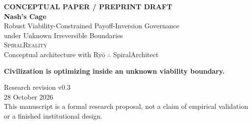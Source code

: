 \documentclass[11pt,a4paper]{article}
\numberwithin{equation}{section}
\theoremstyle{definition}
\theoremstyle{plain}
\theoremstyle{remark}
\begin{document}
\hypersetup{pageanchor=false}
\begin{titlepage}
\thispagestyle{empty}
\centering
\vspace*{1.6cm}
{\small\bfseries\color{Moss}\MakeUppercase{Conceptual Paper / Preprint Draft}}\\[1.1cm]
{\fontsize{31}{36}\selectfont\bfseries\color{Forest} Nash's Cage}\\[0.55cm]
{\fontsize{17}{22}\selectfont\color{Earth}
Robust Viability-Constrained Payoff-Inversion Governance\\
under Unknown Irreversible Boundaries}\\[1.6cm]

{\Large\textsc{SpiralReality}}\\[0.35cm]
{\large Conceptual architecture with Ry\={o} $\therefore$ SpiralArchitect}\\[1.5cm]

\begin{tcolorbox}[width=0.84\textwidth,colback=Mist,colframe=Forest,boxrule=0.8pt]
\centering\large\bfseries
Civilization is optimizing inside an unknown viability boundary.
\end{tcolorbox}

\vfill
{\large Research revision v0.3}\\[0.2cm]
{\large 28 October 2026}\\[1cm]
{\small This manuscript is a formal research proposal, not a claim of empirical validation or a finished institutional design.}
\end{titlepage}
\hypersetup{pageanchor=true}
\setcounter{page}{1}
\end{document}
